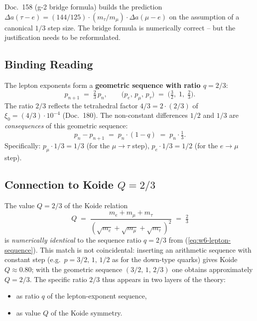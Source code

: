 Doc.~158 (g-2 bridge formula) builds the prediction
$\Delta a(\tau{-}e) = (144/125) \cdot (m_\tau/m_\mu) \cdot \Delta a(\mu{-}e)$
on the assumption of a canonical $1/3$ step size. The bridge formula
is numerically correct -- but the justification needs to be reformulated.

\subsection*{Binding Reading}

The lepton exponents form a \textbf{geometric sequence with ratio
$q = 2/3$}:
\begin{equation}
  p_{n+1} \;=\; \tfrac{2}{3}\, p_n,
  \qquad
  \bigl(p_e,\, p_\mu,\, p_\tau\bigr)
  \;=\; \bigl(\tfrac{3}{2},\;1,\;\tfrac{2}{3}\bigr).
  \label{eq:w6-lepton-sequence}
\end{equation}
The ratio $2/3$ reflects the tetrahedral factor $4/3 = 2\cdot(2/3)$ of
$\xi_0 = (4/3) \cdot 10^{-4}$ (Doc.~180). The non-constant
differences $1/2$ and $1/3$ are \emph{consequences} of this geometric
sequence:
\begin{equation}
  p_n - p_{n+1} \;=\; p_n \cdot (1 - q) \;=\; p_n \cdot \tfrac{1}{3}.
\end{equation}
Specifically: $p_\mu \cdot 1/3 = 1/3$ (for the $\mu \to \tau$ step),
$p_e \cdot 1/3 = 1/2$ (for the $e \to \mu$ step).

\subsection*{Connection to Koide $Q = 2/3$}

The value $Q = 2/3$ of the Koide relation
\begin{equation}
  Q \;=\; \frac{m_e + m_\mu + m_\tau}{(\sqrt{m_e}+\sqrt{m_\mu}+\sqrt{m_\tau})^2}
  \;=\; \tfrac{2}{3}
\end{equation}
is \emph{numerically identical} to the sequence ratio $q = 2/3$ from
(\ref{eq:w6-lepton-sequence}). This match is not coincidental:
inserting an arithmetic sequence with constant step (e.g.\
$p = 3/2,\,1,\,1/2$ as for the down-type quarks) gives Koide
$Q \approx 0.80$; with the geometric sequence $(3/2,\,1,\,2/3)$ one
obtains approximately $Q = 2/3$. The specific ratio $2/3$ thus appears in two
layers of the theory:
\begin{itemize}[leftmargin=2em,itemsep=2pt,topsep=2pt]
  \item as ratio $q$ of the lepton-exponent sequence,
  \item as value $Q$ of the Koide symmetry.
\end{itemize}

